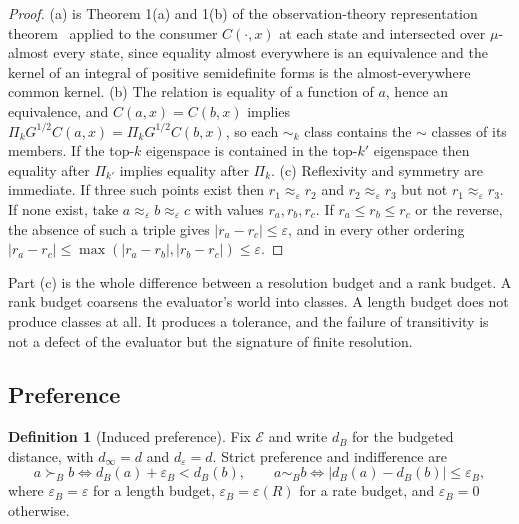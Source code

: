 \documentclass[11pt]{article}
\theoremstyle{definition}
\newtheorem{definition}{Definition}
\theoremstyle{remark}
\newcommand{\Ev}{\mathcal{E}}
\begin{document}
\begin{proof}
(a) is Theorem 1(a) and 1(b) of the observation-theory representation theorem~\cite{bond2026or} applied to the consumer $C(\cdot,x)$ at each state and intersected over $\mu$-almost every state, since equality almost everywhere is an equivalence and the kernel of an integral of positive semidefinite forms is the almost-everywhere common kernel.
(b) The relation is equality of a function of $a$, hence an equivalence, and $C(a,x)=C(b,x)$ implies $\Pi_{k}G^{1/2}C(a,x)=\Pi_{k}G^{1/2}C(b,x)$, so each $\sim_{k}$ class contains the $\sim$ classes of its members. If the top-$k$ eigenspace is contained in the top-$k'$ eigenspace then equality after $\Pi_{k'}$ implies equality after $\Pi_{k}$.
(c) Reflexivity and symmetry are immediate. If three such points exist then $r_{1}\approx_{\varepsilon}r_{2}$ and $r_{2}\approx_{\varepsilon}r_{3}$ but not $r_{1}\approx_{\varepsilon}r_{3}$. If none exist, take $a\approx_{\varepsilon}b\approx_{\varepsilon}c$ with values $r_{a},r_{b},r_{c}$. If $r_{a}\le r_{b}\le r_{c}$ or the reverse, the absence of such a triple gives $|r_{a}-r_{c}|\le\varepsilon$, and in every other ordering $|r_{a}-r_{c}|\le\max(|r_{a}-r_{b}|,|r_{b}-r_{c}|)\le\varepsilon$.
\end{proof}

Part (c) is the whole difference between a resolution budget and a rank budget.
A rank budget coarsens the evaluator's world into classes.
A length budget does not produce classes at all.
It produces a tolerance, and the failure of transitivity is not a defect of the evaluator but the signature of finite resolution.

\subsection{Preference}

\begin{definition}[Induced preference]
\label{def:pref}
Fix $\Ev$ and write $d_{B}$ for the budgeted distance, with $d_{\infty}=d$ and $d_{\varepsilon}=d$.
Strict preference and indifference are
\[
a\succ_{B}b \iff d_{B}(a)+\varepsilon_{B}<d_{B}(b),
\qquad
a\sim_{B}b \iff |d_{B}(a)-d_{B}(b)|\le\varepsilon_{B},
\]
where $\varepsilon_{B}=\varepsilon$ for a length budget, $\varepsilon_{B}=\varepsilon(R)$ for a rate budget, and $\varepsilon_{B}=0$ otherwise.
\end{definition}
\end{document}
